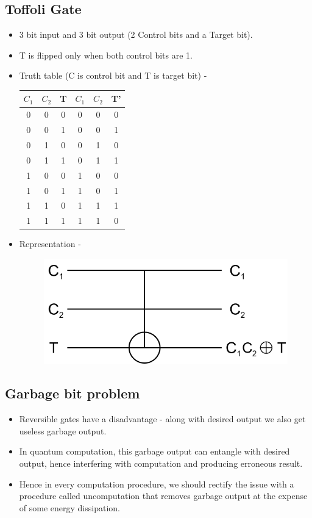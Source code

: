 \documentclass[11.5pt, paper=a4]{article}
\theoremstyle{definition}
\numberwithin{theorem}{section}
\begin{document}
\subsection{Toffoli Gate}
\begin{itemize}
        \item 3 bit input and 3 bit output (2 Control bits and a Target bit).
        \item T is flipped only when both control bits are 1.
        \item Truth table (C is control bit and T is target bit) - 
            \begin{center}
            \begin{tabular}{ |c|c|c|c|c|c| } 
            \hline
            $C_1$ & $C_2$ & T & $C_1$ & $C_2$ & T'\\ 
            \hline
            0 & 0 & 0 & 0 & 0 & 0\\
            0 & 0 & 1 & 0 & 0 & 1\\
            0 & 1 & 0 & 0 & 1 & 0\\
            0 & 1 & 1 & 0 & 1 & 1\\
            1 & 0 & 0 & 1 & 0 & 0\\
            1 & 0 & 1 & 1 & 0 & 1\\
            1 & 1 & 0 & 1 & 1 & 1\\
            1 & 1 & 1 & 1 & 1 & 0\\
            \hline
            \end{tabular}
            \end{center}
        \item Representation -
        \begin{figure}[h]
            \centering
            \includegraphics[scale=0.3]{Toffoli.png}
        \end{figure}
    \end{itemize}
\subsection{Garbage bit problem}
\begin{itemize}
    \item Reversible gates have a disadvantage - along with desired output we also get useless garbage output.
    \item In quantum computation, this garbage output can entangle with desired output, hence interfering with computation and producing erroneous result.
    \item Hence in every computation procedure, we should rectify the issue with a procedure called uncomputation that removes garbage output at the expense of some energy dissipation.
\end{itemize}
\end{document}
